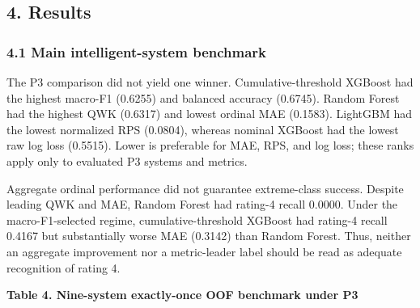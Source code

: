 \documentclass[
  a4paper,
  review]{elsarticle}
\begin{document}
\subsection{4. Results}\label{results}

\subsubsection{4.1 Main intelligent-system
benchmark}\label{main-intelligent-system-benchmark}

The P3 comparison did not yield one winner. Cumulative-threshold XGBoost
had the highest macro-F1 (0.6255) and balanced accuracy (0.6745). Random
Forest had the highest QWK (0.6317) and lowest ordinal MAE (0.1583).
LightGBM had the lowest normalized RPS (0.0804), whereas nominal XGBoost
had the lowest raw log loss (0.5515). Lower is preferable for MAE, RPS,
and log loss; these ranks apply only to evaluated P3 systems and
metrics.

Aggregate ordinal performance did not guarantee extreme-class success.
Despite leading QWK and MAE, Random Forest had rating-4 recall 0.0000.
Under the macro-F1-selected regime, cumulative-threshold XGBoost had
rating-4 recall 0.4167 but substantially worse MAE (0.3142) than Random
Forest. Thus, neither an aggregate improvement nor a metric-leader label
should be read as adequate recognition of rating 4.

\textbf{Table 4. Nine-system exactly-once OOF benchmark under P3}
\end{document}
